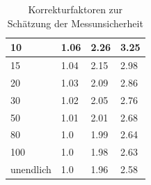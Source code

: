 \documentclass[SSS_Laborbericht.tex]{subfiles}
\begin{document}
\begin{table}[H]
\begin{tabular}{|l|l|l|l|}
10                                                             & 1.06                                                                & 2.26                                                             & 3.25                                                             \\ \hline
15                                                             & 1.04                                                                & 2.15                                                             & 2.98                                                             \\ \hline
20                                                             & 1.03                                                                & 2.09                                                             & 2.86                                                             \\ \hline
30                                                             & 1.02                                                                & 2.05                                                             & 2.76                                                             \\ \hline
50                                                             & 1.01                                                                & 2.01                                                             & 2.68                                                             \\ \hline
80                                                             & 1.0                                                                 & 1.99                                                             & 2.64                                                             \\ \hline
100                                                            & 1.0                                                                 & 1.98                                                             & 2.63                                                             \\ \hline
unendlich                                                      & 1.0                                                                 & 1.96                                                             & 2.58                                                             \\ \hline
\end{tabular}
\caption{Korrekturfaktoren zur Schätzung der Messunsicherheit\cite[S.10]{Franz2016b}}
\label{tab:KORREKTURFAKTUREN}
\end{table}
\end{document}
